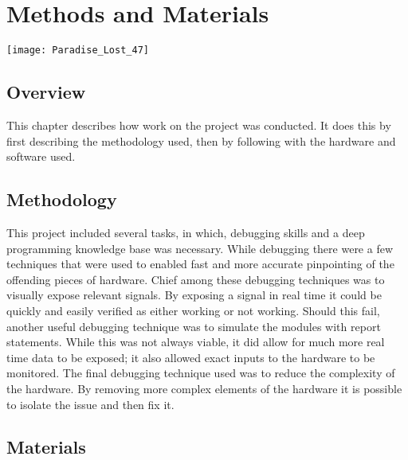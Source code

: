 
\chapter{Methods and Materials} %

\texttt{[image: Paradise\_Lost\_47]}

\label{Chapter 3} %

\section{Overview}

This chapter describes how work on the project was conducted. It does this by first describing the methodology used, then by following with the hardware and software used.


\section{Methodology}

\label{Ch3 Sec1}

This project included several tasks, in which, debugging skills and a deep programming knowledge base was necessary. While debugging there were a few techniques that were used to enabled fast and more accurate pinpointing of the offending pieces of hardware. Chief among these debugging techniques was to visually expose relevant signals. By exposing a signal in real time it could be quickly and easily verified as either working or not working. Should this fail, another useful debugging technique was to simulate the modules with report statements. While this was not always viable, it did allow for much more real time data to be exposed; it also allowed exact inputs to the hardware to be monitored. The final debugging technique used was to reduce the complexity of the hardware. By removing more complex elements of the hardware it is possible to isolate the issue and then fix it.

\section{Materials}

